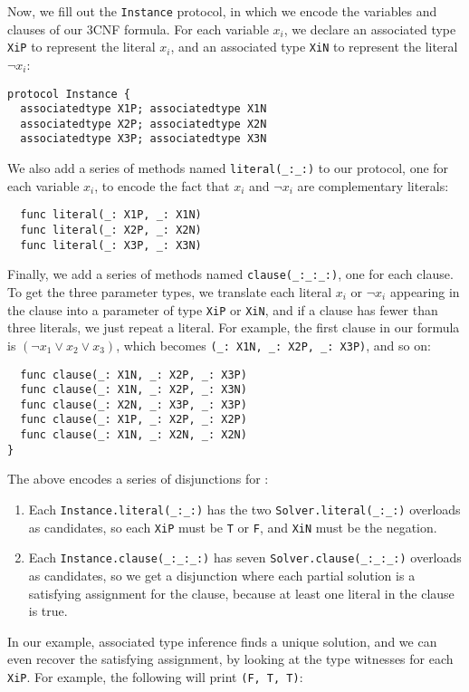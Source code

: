 \documentclass[../generics]{subfiles}
\begin{document}
Now, we fill out the \texttt{Instance} protocol, in which we encode the variables and clauses of our 3CNF formula. For each variable $x_i$, we declare an associated type \texttt{XiP} to represent the literal $x_i$, and an associated type \texttt{XiN} to represent the literal $\neg x_i$:
\begin{Verbatim}
protocol Instance {
  associatedtype X1P; associatedtype X1N
  associatedtype X2P; associatedtype X2N
  associatedtype X3P; associatedtype X3N
\end{Verbatim}
We also add a series of methods named \verb|literal(_:_:)| to our protocol, one for each variable $x_i$, to encode the fact that $x_i$ and $\neg x_i$ are complementary literals:
\begin{Verbatim}
  func literal(_: X1P, _: X1N)
  func literal(_: X2P, _: X2N)
  func literal(_: X3P, _: X3N)
\end{Verbatim}
Finally, we add a series of methods named \verb|clause(_:_:_:)|, one for each clause. To get the three parameter types, we translate each literal $x_i$ or $\neg x_i$ appearing in the clause into a parameter of type \texttt{XiP} or \texttt{XiN}, and if a clause has fewer than three literals, we just repeat a literal. For example, the first clause in our formula is $(\neg x_1 \vee x_2 \vee x_3)$, which becomes \verb|(_: X1N, _: X2P, _: X3P)|, and so on:
\begin{Verbatim}
  func clause(_: X1N, _: X2P, _: X3P)
  func clause(_: X1N, _: X2P, _: X3N)
  func clause(_: X2N, _: X3P, _: X3P)
  func clause(_: X1P, _: X2P, _: X2P)
  func clause(_: X1N, _: X2N, _: X2N)
}
\end{Verbatim}
The above encodes a series of disjunctions for :
\begin{enumerate}
\item Each \verb|Instance.literal(_:_:)| has the two \verb|Solver.literal(_:_:)| overloads as candidates, so each \texttt{XiP} must be \texttt{T} or \texttt{F}, and \texttt{XiN} must be the negation.
\item Each \verb|Instance.clause(_:_:_:)| has seven \verb|Solver.clause(_:_:_:)| overloads as candidates, so we get a disjunction where each partial solution is a satisfying assignment for the clause, because at least one literal in the clause is true.
\end{enumerate}
In our example, associated type inference finds a unique solution, and we can even recover the satisfying assignment, by looking at the type witnesses for each \texttt{XiP}. For example, the following will print \verb|(F, T, T)|:
\end{document}
